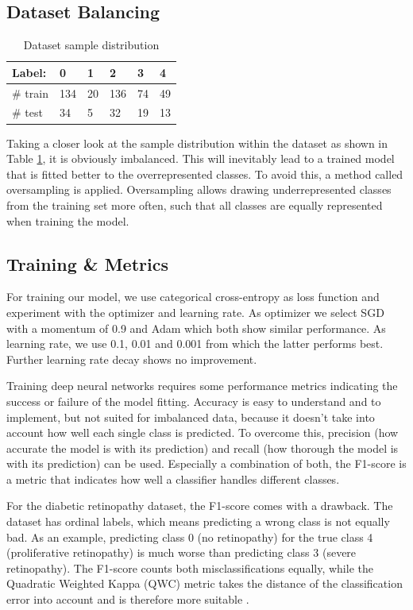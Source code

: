 \documentclass{article}
\begin{document}
\subsection{Dataset Balancing}
\renewcommand{\arraystretch}{1.2}
\begin{table}
  \vspace{-15pt}
  \centering
  \begin{tabular}{|l|l|l|l|l|l|}
  \hline
  Label:   & 0   & 1  & 2   & 3  & 4  \\ \hline \hline
  \# train & 134 & 20 & 136 & 74 & 49 \\ \hline
  \# test  & 34  & 5  & 32  & 19 & 13 \\ \hline
  \end{tabular}
  \caption{Dataset sample distribution} \label{tab:table1}
  \end{table}
Taking a closer look at the sample distribution within the dataset as shown in Table \ref{tab:table1}, it is obviously imbalanced. This will inevitably lead to a trained model
that is fitted better to the overrepresented classes.
To avoid this, a method called oversampling is applied. Oversampling allows drawing underrepresented classes from the training set more often, 
such that all classes are equally represented when training the model.
\pagebreak
\subsection{Training \& Metrics}
For training our model, we use categorical cross-entropy as loss function and experiment with the optimizer and 
learning rate. As optimizer we select SGD with a momentum of 0.9 and Adam which both show similar performance. 
As learning rate, we use 0.1, 0.01 and 0.001 from which the latter performs best. Further learning rate decay
shows no improvement.

Training deep neural networks requires some performance metrics indicating the success or failure of the model fitting. Accuracy
is easy to understand and to implement, but not suited for imbalanced data, because it doesn't take into account how well each 
single class is predicted. 
To overcome this, precision (how accurate the model is with its prediction) and recall (how thorough the model is with its prediction) can be used. 
Especially a combination of both, the F1-score is a metric that indicates how well a classifier handles different classes.

For the diabetic retinopathy dataset, the F1-score comes with a drawback. The dataset has ordinal labels, which means predicting 
a wrong class is not equally bad. As an example, predicting class 0 (no retinopathy) for the true class 4 (proliferative retinopathy) 
is much worse than predicting class 3 (severe retinopathy). The F1-score counts both misclassifications equally, while the 
Quadratic Weighted Kappa (QWC) metric takes the distance of the classification error into account and is therefore more suitable \cite{QWC}.
\end{document}
